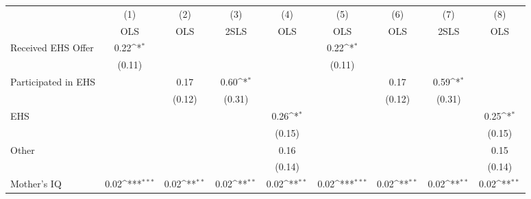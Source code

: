 {
\def\sym#1{\ifmmode^{#1}\else\(^{#1}\)\fi}
\begin{tabular}{l*{8}{c}}
\hline\hline
                    &\multicolumn{1}{c}{(1)}&\multicolumn{1}{c}{(2)}&\multicolumn{1}{c}{(3)}&\multicolumn{1}{c}{(4)}&\multicolumn{1}{c}{(5)}&\multicolumn{1}{c}{(6)}&\multicolumn{1}{c}{(7)}&\multicolumn{1}{c}{(8)}\\
                    &\multicolumn{1}{c}{OLS}&\multicolumn{1}{c}{OLS}&\multicolumn{1}{c}{2SLS}&\multicolumn{1}{c}{OLS}&\multicolumn{1}{c}{OLS}&\multicolumn{1}{c}{OLS}&\multicolumn{1}{c}{2SLS}&\multicolumn{1}{c}{OLS}\\
\hline
Received EHS Offer  &        0.22\sym{*}  &                     &                     &                     &        0.22\sym{*}  &                     &                     &                     \\
                    &      (0.11)         &                     &                     &                     &      (0.11)         &                     &                     &                     \\
[1em]
Participated in EHS &                     &        0.17         &        0.60\sym{*}  &                     &                     &        0.17         &        0.59\sym{*}  &                     \\
                    &                     &      (0.12)         &      (0.31)         &                     &                     &      (0.12)         &      (0.31)         &                     \\
[1em]
EHS                 &                     &                     &                     &        0.26\sym{*}  &                     &                     &                     &        0.25\sym{*}  \\
                    &                     &                     &                     &      (0.15)         &                     &                     &                     &      (0.15)         \\
[1em]
Other               &                     &                     &                     &        0.16         &                     &                     &                     &        0.15         \\
                    &                     &                     &                     &      (0.14)         &                     &                     &                     &      (0.14)         \\
[1em]
Mother's IQ         &        0.02\sym{***}&        0.02\sym{**} &        0.02\sym{**} &        0.02\sym{**} &        0.02\sym{***}&        0.02\sym{**} &        0.02\sym{**} &        0.02\sym{**} \\

\end{tabular}}
